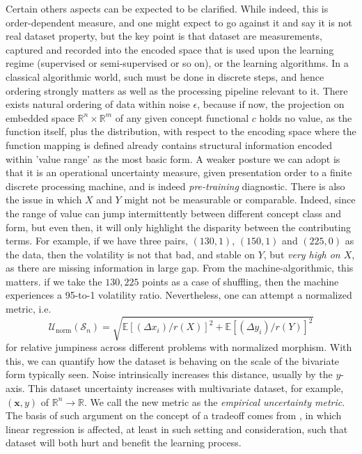 Certain others aspects can be expected to be clarified. While indeed, this is order-dependent measure, and one might expect to go against it and say it is not real dataset property, but the key point is that dataset are measurements, captured and recorded into the encoded space that is used upon the learning regime (supervised or semi-supervised or so on), or the learning algorithms. In a classical algorithmic world, such must be done in discrete steps, and hence ordering strongly matters as well as the processing pipeline relevant to it. There exists natural ordering of data within noise $\epsilon$, because if now, the projection on embedded space $\mathbb{R}^{n}\times \mathbb{R}^{m}$ of any given concept functional $c$ holds no value, as the function itself, plus the distribution, with respect to the encoding space where the function mapping is defined already contains structural information encoded within 'value range' as the most basic form. A weaker posture we can adopt is that it is an operational uncertainty measure, given presentation order to a finite discrete processing machine, and is indeed \textit{pre-training} diagnostic. There is also the issue in which $X$ and $Y$ might not be measurable or comparable. Indeed, since the range of value can jump intermittently between different concept class and form, but even then, it will only highlight the disparity between the contributing terms. For example, if we have three pairs, $(130,1)$, $(150,1)$ and $(225,0)$ as the data, then the volatility is not that bad, and stable on $Y$, but \textit{very high on $X$}, as there are missing information in large gap. From the machine-algorithmic, this matters. if we take the $130,225$ points as a case of shuffling, then the machine experiences a 95-to-1 volatility ratio. Nevertheless, one can attempt a normalized metric, i.e. 
\begin{equation}
    \mathcal{U}_{\mathrm{norm}}(\mathcal{S}_{n}) = \sqrt{\mathbb{E}[(\Delta x_{i})/r(X)]^{2}+\mathbb{E}[(\Delta y_{i})/r(Y)]^{2}}
\end{equation}
for relative jumpiness across different problems with normalized morphism. 
With this, we can quantify how the dataset is behaving on the scale of the bivariate form typically seen. Noise intrinsically increases this distance, usually by the $y$-axis. This dataset uncertainty increases with multivariate dataset, for example, $(\mathbf{x},y)$ of $\mathbb{R}^{n}\to\mathbb{R}$. We call the new metric as the \textit{empirical uncertainty metric}. The basis of such argument on the concept of a tradeoff comes from \cite{nakkiran2019datahurtlinearregression}, in which linear regression is affected, at least in such setting and consideration, such that dataset will both hurt and benefit the learning process. 

